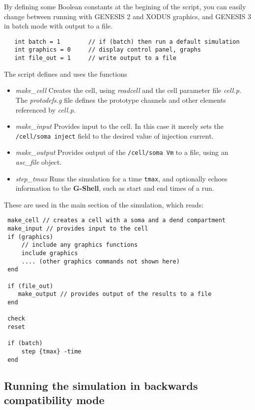 \documentclass[12pt]{article}
\begin{document}
By defining some Boolean constants at the begining of the script,
you can easily change between running with GENESIS 2 and XODUS graphics,
and GENESIS 3 in batch mode with output to a file.
\begin{verbatim}
   int batch = 1        // if (batch) then run a default simulation
   int graphics = 0     // display control panel, graphs
   int file_out = 1     // write output to a file
\end{verbatim}
The script defines and uses the functions
\begin{itemize}
\item {\it make\_cell} Creates the cell, using {\it readcell} and the cell parameter file
     {\it cell.p}.  The {\it protodefs.g} file defines the prototype channels and
     other elements referenced by {\it cell.p}.

\item {\it make\_input} Provides input to the cell.  In this case it merely
     sets the {\tt /cell/soma inject} field to the desired value of injection
     current.

\item {\it make\_output} Provides output of the {\tt /cell/soma Vm}  to a file, using
     an {\it asc\_file} object.

\item {\it step\_tmax} Runs the simulation for a time {\tt tmax}, and optionally
     echoes information to the {\bf G-Shell}, such as start and end times of a
     run.
\end{itemize}
These are used in the main section of the simulation, which reads:
\begin{verbatim}
 make_cell // creates a cell with a soma and a dend compartment
 make_input // provides input to the cell
 if (graphics)
     // include any graphics functions
     include graphics
     .... (other graphics commands not shown here)
 end

 if (file_out)
    make_output // provides output of the results to a file
 end

 check
 reset

 if (batch)
     step {tmax} -time
 end
\end{verbatim}

\subsection*{Running the simulation in backwards compatibility mode}
\end{document}
